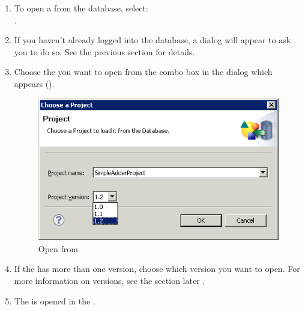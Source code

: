 

\begin{enumerate}
\item To open a \gdproject{} from the database, select:\\
. 
\item If you haven't already logged into the database, a dialog will appear to ask you to do so.  See the previous section  for details. 
\item Choose the \gdproject{} you want to open from the combo box in the dialog which appears (). 

\begin{figure}
\includegraphics{Tasks/Projects/PS/loadfromdb}
\caption{Open \gdproject{} from \gddb{}}
\label{loadfromdb}
\end{figure}

\item If the \gdproject{} has more than one version, choose which version you want to open. For more information on \gdproject{} versions, see the section later . 
\item The \gdproject{} is opened in the \ite{}. 
\end{enumerate}



  
